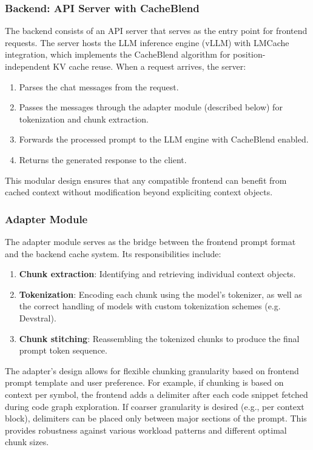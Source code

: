 \subsubsection{Backend: API Server with CacheBlend}

The backend consists of an API server that serves as the entry point for frontend requests. The server hosts the LLM inference engine (vLLM) with LMCache integration, which implements the CacheBlend algorithm for position-independent KV cache reuse. When a request arrives, the server:
\begin{enumerate}
    \item Parses the chat messages from the request.
    \item Passes the messages through the adapter module (described below) for tokenization and chunk extraction.
    \item Forwards the processed prompt to the LLM engine with CacheBlend enabled.
    \item Returns the generated response to the client.
\end{enumerate}

This modular design ensures that any compatible frontend can benefit from cached context without modification beyond expliciting context objects.


\subsubsection{Adapter Module}

The adapter module serves as the bridge between the frontend prompt format and the backend cache system. Its responsibilities include:
\begin{enumerate}
    \item \textbf{Chunk extraction}: Identifying and retrieving individual context objects.
    \item \textbf{Tokenization}: Encoding each chunk using the model's tokenizer, as well as the correct handling of models with custom tokenization schemes (e.g. Devstral).
    \item \textbf{Chunk stitching}: Reassembling the tokenized chunks to produce the final prompt token sequence.
\end{enumerate}

The adapter's design allows for flexible chunking granularity based on frontend prompt template and user preference. For example, if chunking is based on context per symbol, the frontend adds a delimiter after each code snippet fetched during code graph exploration. If coarser granularity is desired (e.g., per context block), delimiters can be placed only between major sections of the prompt. This provides robustness against various workload patterns and different optimal chunk sizes. 

